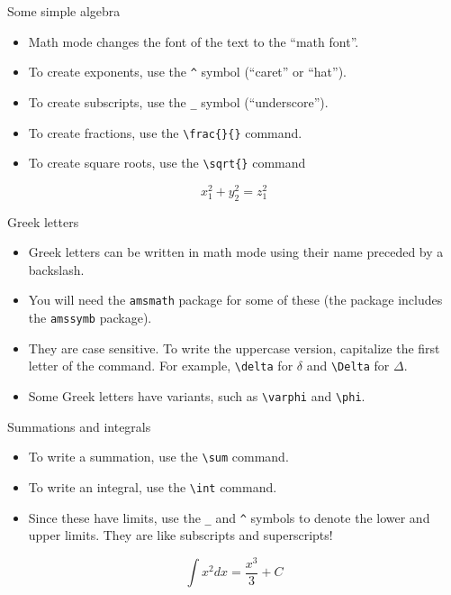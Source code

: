 \documentclass[t,12pt,xcolor=dvipsnames]{beamer}
\begin{document}
\begin{frame}{Some simple algebra}
    \begin{itemize}
        \item Math mode changes the font of the text to the \enquote{math font}.
        \item To create exponents, use the \texttt{\^} symbol (\enquote{caret} or \enquote{hat}).
        \item To create subscripts, use the \texttt{\_} symbol (\enquote{underscore}).
        \item To create fractions, use the \texttt{\textbackslash frac\{\}\{\}} command.
        \item To create square roots, use the \texttt{\textbackslash sqrt\{\}} command
    \end{itemize}
    $$ x_1^2 + y_2^2 = z_1^2 $$
\end{frame}
\begin{frame}{Greek letters}
    \begin{itemize}
        \item Greek letters can be written in math mode using their name preceded by a backslash.
        \item You will need the \texttt{amsmath} package for some of these (the package includes the \texttt{amssymb} package).
        \item They are case sensitive. To write the uppercase version, capitalize the first letter of the command. For example, \texttt{\textbackslash delta} for $\delta$ and \texttt{\textbackslash Delta} for $\Delta$.
        \item Some Greek letters have variants, such as \texttt{\textbackslash varphi} and \texttt{\textbackslash phi}.
    \end{itemize}
\end{frame}

\begin{frame}{Summations and integrals}
    \begin{itemize}
        \item To write a summation, use the \texttt{\textbackslash sum} command.
        \item To write an integral, use the \texttt{\textbackslash int} command.
        \item Since these have limits, use the \texttt{\_} and \texttt{\^} symbols to denote the lower and upper limits. They are like subscripts and superscripts!
    \end{itemize}
    $$ \int x^2 dx = \frac{x^3}{3} + C $$
\end{frame}
\end{document}
